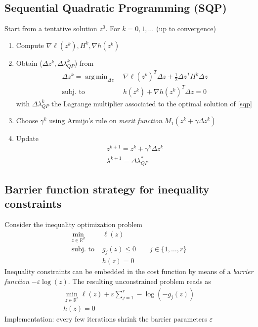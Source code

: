\documentclass[openany]{book}
\DeclareMathOperator*{\argmin}{arg\,min} %
\newcommand{\R}{\mathbb{R}} %
\theoremstyle{definition}
\theoremstyle{remark}
\begin{document}
\subsection{Sequential Quadratic Programming (SQP)}
Start from a tentative solution $z^0$. For $k=0,1,\dots$ (up to convergence)
\begin{enumerate}
    \item Compute $\nabla\ell(z^k),H^k,\nabla h(z^k)$ 
    \item Obtain ($\Delta z^k, \Delta \lambda^k_{QP}$) from 
        \begin{align}\label{sqp}
                \Delta z^k = \argmin_{\Delta z}\  & \nabla \ell(z^k)^T\Delta z +\displaystyle\frac{1}{2}\Delta z^TH^k \Delta z \\
                \text{subj. to }\  & h(z^k) + \nabla h(z^k)^T \Delta z = 0
        \end{align}
        with $\Delta\lambda^k_{QP}$ the Lagrange multiplier associated to the optimal solution of \eqref{sqp}
    \item Choose $\gamma^k$ using Armijo's rule on \emph{merit function} $M_1(z^k+\gamma\Delta z^k)$
    \item Update 
        \begin{gather*}
            z^{k+1} = z^k+ \gamma^k\Delta z^k \\
            \lambda^{k+1} = \Delta \lambda^*_{QP}
        \end{gather*}
\end{enumerate}

\subsection{Barrier function strategy for inequality constraints}
Consider the inequality optimization problem 
\begin{align*}
    \min_{z\in\R^d} & \ell(z) \\
    \text{subj. to } & g_j(z) \leq 0 \qquad j\in\{1,\dots,r\}\\
    & h(z) = 0
\end{align*}
Inequality constraints can be embedded in the cost function by means of a \emph{barrier function} $-\varepsilon \log(z)$. The resulting unconstrained problem reads as 
\begin{gather*}
    \min_{z\in\R^d}\ell(z) + \varepsilon\displaystyle\sum_{j=1}^{r}-\log(-g_j(z)) \\
    h(z) = 0
\end{gather*}
Implementation: every few iterations shrink the barrier parameters $\varepsilon$
\end{document}
